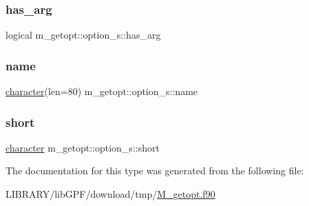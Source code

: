 \subsubsection{\texorpdfstring{has\+\_\+arg}{has\_arg}}
{\footnotesize\ttfamily logical m\+\_\+getopt\+::option\+\_\+s\+::has\+\_\+arg}

\mbox{\label{structm__getopt_1_1option__s_add3050f859164e78b98c04738b4ffb98}} 
\subsubsection{\texorpdfstring{name}{name}}
{\footnotesize\ttfamily \hyperlink{option__stopwatch_83_8txt_abd4b21fbbd175834027b5224bfe97e66}{character}(len=80) m\+\_\+getopt\+::option\+\_\+s\+::name}

\mbox{\label{structm__getopt_1_1option__s_a427aa0a11a8f872eed789f0dd6f54459}} 
\subsubsection{\texorpdfstring{short}{short}}
{\footnotesize\ttfamily \hyperlink{option__stopwatch_83_8txt_abd4b21fbbd175834027b5224bfe97e66}{character} m\+\_\+getopt\+::option\+\_\+s\+::short}



The documentation for this type was generated from the following file\+:\begin{DoxyCompactItemize}
\item 
L\+I\+B\+R\+A\+R\+Y/lib\+G\+P\+F/download/tmp/\hyperlink{M__getopt_8f90}{M\+\_\+getopt.\+f90}\end{DoxyCompactItemize}
